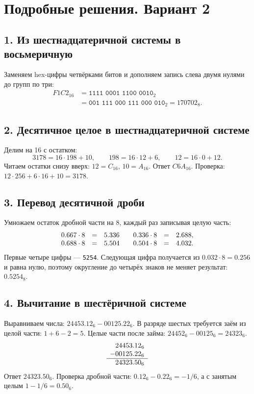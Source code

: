\section*{Подробные решения. Вариант 2}

\subsection*{1. Из шестнадцатеричной системы в восьмеричную}
Заменяем hex-цифры четвёрками битов и дополняем запись слева двумя нулями до групп по три:
\[
\begin{aligned}
F1C2_{16}&=\texttt{1111 0001 1100 0010}_2\\
&=\texttt{001 111 000 111 000 010}_2
=\boxed{170702_8}.
\end{aligned}
\]

\subsection*{2. Десятичное целое в шестнадцатеричной системе}
Делим на 16 с остатком:
\[
3178=16\cdot198+10,\qquad
198=16\cdot12+6,\qquad
12=16\cdot0+12.
\]
Читаем остатки снизу вверх: $12=C_{16}$, $10=A_{16}$. Ответ $\boxed{C6A_{16}}$. Проверка: $12\cdot256+6\cdot16+10=3178$.

\subsection*{3. Перевод десятичной дроби}
Умножаем остаток дробной части на 8, каждый раз записывая целую часть:
\[
\begin{array}{rcl@{\qquad}rcl}
0.667\cdot8&=&5.336&0.336\cdot8&=&2.688,\\
0.688\cdot8&=&5.504&0.504\cdot8&=&4.032.
\end{array}
\]
Первые четыре цифры --- \texttt{5254}. Следующая цифра получается из $0.032\cdot8=0.256$ и равна нулю, поэтому округление до четырёх знаков не меняет результат: $\boxed{0.5254_8}$.

\subsection*{4. Вычитание в шестёричной системе}
Выравниваем числа: $24453.12_6-00125.22_6$. В разряде шестых требуется заём из целой части: $1+6-2=5$. Целые части после займа: $24452_6-00125_6=24323_6$.
\[
\begin{array}{r@{}l}
24453&.12_6\\
-00125&.22_6\\\hline
24323&.50_6
\end{array}
\]
Ответ $\boxed{24323.50_6}$. Проверка дробной части: $0.12_6-0.22_6=-1/6$, а с занятым целым $1-1/6=0.50_6$.

